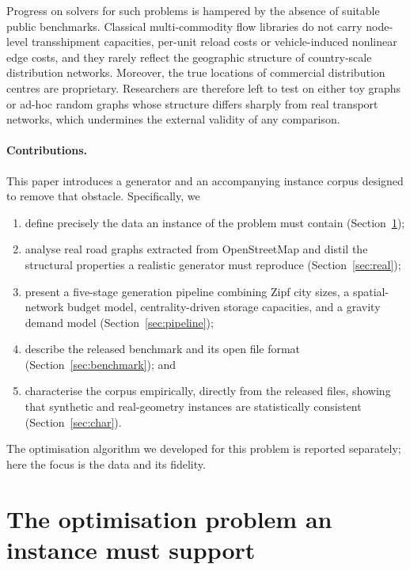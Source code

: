 \documentclass[11pt]{article}
\begin{document}
Progress on solvers for such problems is hampered by the absence of suitable
public benchmarks. Classical multi-commodity flow libraries do not carry
node-level transshipment capacities, per-unit reload costs or vehicle-induced
nonlinear edge costs, and they rarely reflect the geographic structure of
country-scale distribution networks. Moreover, the true locations of commercial
distribution centres are proprietary. Researchers are therefore left to test on
either toy graphs or ad-hoc random graphs whose structure differs sharply from
real transport networks, which undermines the external validity of any
comparison.

\paragraph{Contributions.}
This paper introduces a generator and an accompanying instance corpus designed
to remove that obstacle. Specifically, we
\begin{enumerate}[leftmargin=1.4em,itemsep=1pt,topsep=2pt]
\item define precisely the data an instance of the problem must contain
      (Section~\ref{sec:problem});
\item analyse real road graphs extracted from OpenStreetMap and distil the
      structural properties a realistic generator must reproduce
      (Section~\ref{sec:real});
\item present a five-stage generation pipeline combining Zipf city sizes, a
      spatial-network budget model, centrality-driven storage capacities, and a
      gravity demand model (Section~\ref{sec:pipeline});
\item describe the released benchmark and its open file format
      (Section~\ref{sec:benchmark}); and
\item characterise the corpus empirically, directly from the released files,
      showing that synthetic and real-geometry instances are statistically
      consistent (Section~\ref{sec:char}).
\end{enumerate}
The optimisation algorithm we developed for this problem is reported separately;
here the focus is the data and its fidelity.

\section{The optimisation problem an instance must support}
\label{sec:problem}
\end{document}
